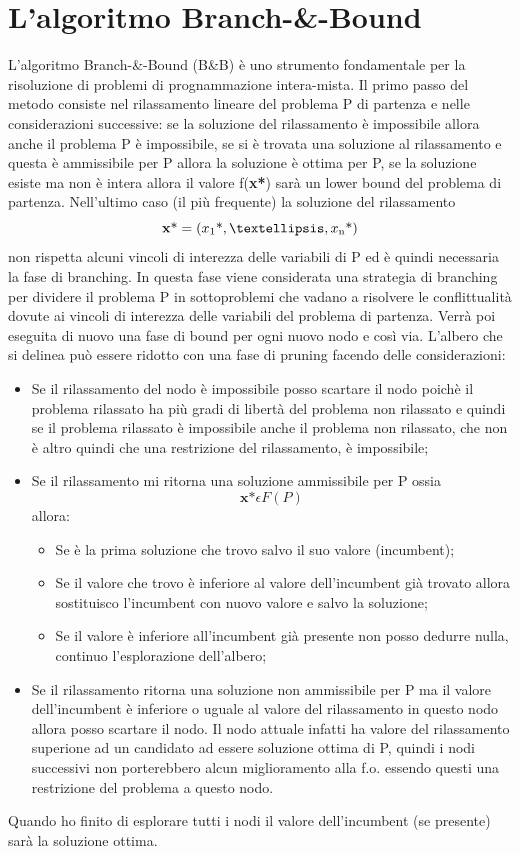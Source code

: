 \documentclass[12pt,a4paper,twoside,openright]{book}
\begin{document}
\section{L'algoritmo Branch-\&-Bound}
L'algoritmo Branch-\&-Bound (B\&B) è uno strumento fondamentale per la risoluzione di problemi di 
prognammazione intera-mista. Il primo passo del metodo consiste nel rilassamento lineare del problema P di partenza e nelle considerazioni
successive: se la soluzione del rilassamento è impossibile allora anche il problema P è impossibile, 
se si è trovata una soluzione al rilassamento e questa è ammissibile per P allora la 
soluzione è ottima per P, se la soluzione esiste ma non è intera allora il valore f(\textbf{x\textup{*}}) 
sarà un lower bound del problema di partenza.
Nell’ultimo caso (il più frequente) la soluzione del rilassamento \[\textbf{x}\textup{*} = 
(x \textsubscript{1} \textup{*}, …, x\textsubscript{n} \textup{*})\] non rispetta alcuni 
vincoli di interezza delle variabili di P ed è quindi necessaria la fase di branching.
In questa fase viene considerata una strategia di branching per dividere il problema P 
in sottoproblemi che vadano a risolvere le conflittualità dovute ai vincoli di interezza 
delle variabili del problema di partenza. Verrà poi eseguita di nuovo una 
fase di bound per ogni nuovo nodo e così via.
L’albero che si delinea può essere ridotto con una fase di pruning facendo delle 
considerazioni:
\begin{itemize}
    \item Se il rilassamento del nodo è impossibile posso scartare il nodo poichè
        il problema rilassato ha più gradi di libertà del problema non rilassato e
        quindi se il problema rilassato è impossibile anche il problema non rilassato, che
        non è altro quindi che una restrizione del rilassamento, è impossibile;
    \item Se il rilassamento mi ritorna una soluzione ammissibile per P ossia 
    \[\textbf{x*} \epsilon F(P)\] allora:
        \begin{itemize}
            \item Se è la prima soluzione che trovo salvo il suo valore (incumbent);
            \item Se il valore che trovo è inferiore al valore dell’incumbent già 
                trovato allora sostituisco l’incumbent con nuovo valore e salvo la 
                soluzione;
            \item Se il valore è inferiore all'incumbent già presente non posso dedurre nulla,
                continuo l'esplorazione dell'albero;
        \end{itemize}
    \item Se il rilassamento ritorna una soluzione non ammissibile per P ma il valore 
        dell’incumbent è inferiore o uguale al valore del rilassamento in questo nodo allora posso
        scartare il nodo. Il nodo attuale infatti ha valore del rilassamento superione ad un
        candidato ad essere soluzione ottima di P, quindi i nodi successivi non porterebbero 
        alcun miglioramento alla f.o. essendo questi una restrizione del problema a questo nodo. 
\end{itemize}
Quando ho finito di esplorare tutti i nodi il valore dell’incumbent (se presente) sarà la soluzione ottima.
\end{document}
